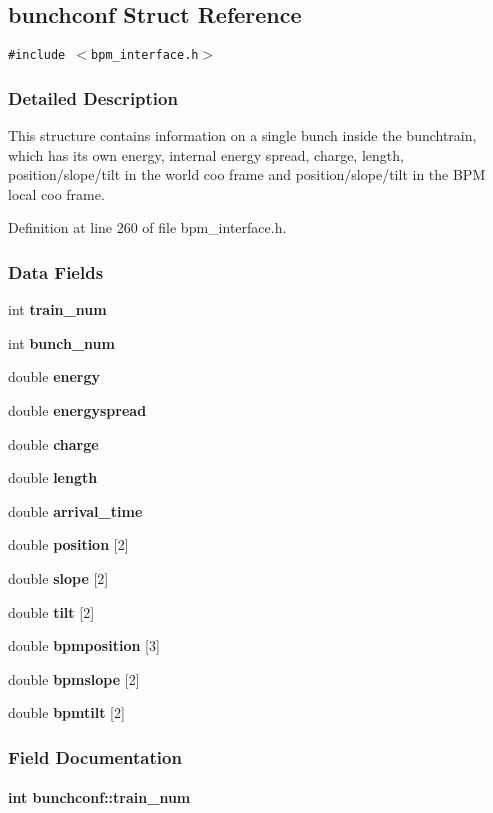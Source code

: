 \subsection{bunchconf Struct Reference}
\label{structbunchconf}
{\tt \#include $<$bpm\_\-interface.h$>$}



\subsubsection{Detailed Description}
This structure contains information on a single bunch inside the bunchtrain, which has its own energy, internal energy spread, charge, length, position/slope/tilt in the world coo frame and position/slope/tilt in the BPM local coo frame. 

Definition at line 260 of file bpm\_\-interface.h.\subsubsection*{Data Fields}
\begin{CompactItemize}
\item 
int {\bf train\_\-num}
\item 
int {\bf bunch\_\-num}
\item 
double {\bf energy}
\item 
double {\bf energyspread}
\item 
double \textbf{charge}\label{structbunchconf_2d39addc39dc701e488faaace1d7b711}

\item 
double {\bf length}
\item 
double {\bf arrival\_\-time}
\item 
double {\bf position} [2]
\item 
double {\bf slope} [2]
\item 
double {\bf tilt} [2]
\item 
double {\bf bpmposition} [3]
\item 
double {\bf bpmslope} [2]
\item 
double {\bf bpmtilt} [2]
\end{CompactItemize}


\subsubsection{Field Documentation}
\paragraph[train\_\-num]{\setlength{\rightskip}{0pt plus 5cm}int {\bf bunchconf::train\_\-num}}\hfill\label{structbunchconf_bf9be3f4dbb15b1dd2392265f7ce0b83}


